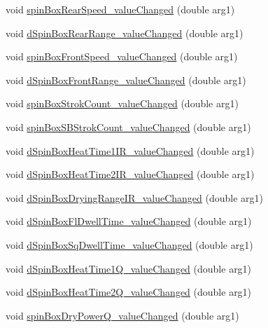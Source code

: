 \begin{DoxyCompactItemize}
\item 
void \mbox{\hyperlink{classSettingDialog_aa6602067bd18c4e6e845d0c217380120}{spin\+Box\+Rear\+Speed\+\_\+value\+Changed}} (double arg1)
\item 
void \mbox{\hyperlink{classSettingDialog_a8a2f78f4b1107c94a07880c93ecaebc4}{d\+Spin\+Box\+Rear\+Range\+\_\+value\+Changed}} (double arg1)
\item 
void \mbox{\hyperlink{classSettingDialog_a02039d7e4a584da46e7bf658b8ed78a7}{spin\+Box\+Front\+Speed\+\_\+value\+Changed}} (double arg1)
\item 
void \mbox{\hyperlink{classSettingDialog_a2943dbf41bfa2b9cee5ad661447ca9be}{d\+Spin\+Box\+Front\+Range\+\_\+value\+Changed}} (double arg1)
\item 
void \mbox{\hyperlink{classSettingDialog_a6cd6886cf912cfb5275754183334e70f}{spin\+Box\+Strok\+Count\+\_\+value\+Changed}} (double arg1)
\item 
void \mbox{\hyperlink{classSettingDialog_abe2d0f0bf0ea4c12cdd18b4c63e18ef2}{spin\+Box\+S\+B\+Strok\+Count\+\_\+value\+Changed}} (double arg1)
\item 
void \mbox{\hyperlink{classSettingDialog_a14fb25d61fdf8e847806ae6ae0143979}{d\+Spin\+Box\+Heat\+Time1\+I\+R\+\_\+value\+Changed}} (double arg1)
\item 
void \mbox{\hyperlink{classSettingDialog_ac43003a00b40d40c1d8518429234d52a}{d\+Spin\+Box\+Heat\+Time2\+I\+R\+\_\+value\+Changed}} (double arg1)
\item 
void \mbox{\hyperlink{classSettingDialog_a9ca34f0f0587dc274c346a0198e69332}{d\+Spin\+Box\+Drying\+Range\+I\+R\+\_\+value\+Changed}} (double arg1)
\item 
void \mbox{\hyperlink{classSettingDialog_a2ba1d0392bf7d998803541765f2114d7}{d\+Spin\+Box\+Fl\+Dwell\+Time\+\_\+value\+Changed}} (double arg1)
\item 
void \mbox{\hyperlink{classSettingDialog_a37e06665f728195a910d80f586cb8932}{d\+Spin\+Box\+Sq\+Dwell\+Time\+\_\+value\+Changed}} (double arg1)
\item 
void \mbox{\hyperlink{classSettingDialog_a2b0e2cfbda5f92f47197fd154e4a7641}{d\+Spin\+Box\+Heat\+Time1\+Q\+\_\+value\+Changed}} (double arg1)
\item 
void \mbox{\hyperlink{classSettingDialog_ac3915bcd030a25082dab75845291c1e7}{d\+Spin\+Box\+Heat\+Time2\+Q\+\_\+value\+Changed}} (double arg1)
\item 
void \mbox{\hyperlink{classSettingDialog_a79c8072c55146ad38a739567b2233c1f}{spin\+Box\+Dry\+Power\+Q\+\_\+value\+Changed}} (double arg1)

\end{DoxyCompactItemize}
